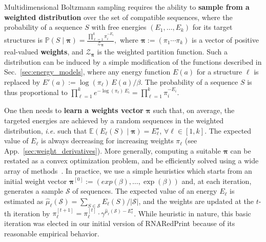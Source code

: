 \documentclass{bioinfo}
\newcommand{\val}{a} %
\newcommand{\partfun}[1]{\mathcal{Z}_{#1}}
\newcommand{\Def}[1]{{\bf #1}}
\newcommand{\TargetE}{E^{\star}}
\newcommand{\Software}[1]{{\ttfamily #1}}
\newcommand{\ourprog}{\Software{RNARedPrint}}
\begin{document}
Multidimensional Boltzmann sampling requires the ability to \Def{sample from a weighted distribution} over the set of compatible sequences, where the probability of a sequence $S$ with free energies $(E_1,\ldots,E_k)$ for its target structures is
$\mathbb{P}(S\mid \pmb{\pi}) = \frac{\prod_{\ell=1}^{k} \pi_i^{-E_i}}{\partfun{\pmb{\pi}}},$
where $\pmb{\pi}:=(\pi_1\cdots\pi_k)$ is a vector of positive real-valued \Def{weights}, and $\partfun{\pmb{\pi}}$ is the weighted partition function. Such a distribution can be induced by a simple modification of the functions described in Sec.~\ref{sec:energy_models}, where any energy function $E(\val)$ for a structure $\ell$ is replaced by $E'(\val):= \log(\pi_\ell)\, E(\val)/\beta$. The probability of a sequence $S$ is thus proportional to 
$ \prod_{\ell=1}^{k} e^{-\log(\pi_\ell)\, E_i} = \prod_{\ell=1}^{k} \pi_i^{-E_i}. $

One then needs to \Def{learn a weights vector} $\pmb{\pi}$ such that, on average, the targeted energies are achieved by a random sequences in the weighted distribution, \emph{i.e.} such that  $\mathbb{E}(E_\ell(S)\mid \pmb{\pi})=\TargetE_\ell$,  $\forall\ell\in[1,k]$.
The expected value of $E_\ell$ is always decreasing for increasing weights $\pi_\ell$ (see App.~\ref{sec:weight_derivatives}). More generally, computing a suitable $\pmb{\pi}$ can be restated as a convex optimization problem, and be efficiently solved using a wide array of methods~\cite{Denise2010,Bendkowski2017}. 
In practice, we use a simple heuristics which starts from an initial weight vector $\pmb{\pi}^{[0]}:=(exp(\beta),\dots,\exp(\beta))$ and, at each iteration, generates a sample $\mathcal{S}$ of sequences. The expected value of an energy $E_\ell$ is estimated as $\hat\mu_\ell(\mathcal{S}) = \sum_{S\in\mathcal{S}}E_\ell(S)/|\mathcal{S}|$, and the weights are updated at the $t$-th iteration by %
$\pi_\ell^{[t+1]} = \pi_\ell^{[t]}\cdot \gamma^{\hat\mu_\ell(\mathcal{S})-\TargetE_\ell}$.
While heuristic in nature, this basic iteration was elected in our initial version of \ourprog{} because of its reasonable empirical behavior.
\end{document}
